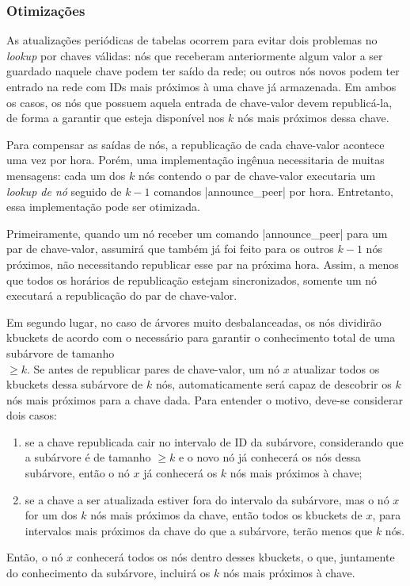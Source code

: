 
\subsubsection*{Otimizações}

As atualizações periódicas de tabelas ocorrem para evitar dois problemas no
\emph{lookup} por chaves válidas: nós que receberam anteriormente algum valor a ser
guardado naquele chave podem ter saído da rede; ou outros nós novos podem ter entrado
na rede com IDs mais próximos à uma chave já armazenada. Em ambos os casos, os nós que
possuem aquela entrada de chave-valor devem republicá-la, de forma a garantir que
esteja disponível nos $k$ nós mais próximos dessa chave.

Para compensar as saídas de nós, a republicação de cada chave-valor acontece uma vez por
hora. Porém, uma implementação ingênua necessitaria de muitas mensagens: cada um dos $k$
nós contendo o par de chave-valor executaria um \emph{lookup de nó} seguido de $k - 1$
comandos \bverb|announce_peer| por hora. Entretanto, essa implementação pode ser
otimizada.

Primeiramente, quando um nó receber um comando \bverb|announce_peer| para um par de
chave-valor, assumirá que também já foi feito para os outros $k - 1$ nós próximos, não
necessitando republicar esse par na próxima hora. Assim, a menos que todos os horários
de republicação estejam sincronizados, somente um nó executará a republicação do par de
chave-valor.

Em segundo lugar, no caso de árvores muito desbalanceadas, os nós dividirão
\glspl*{kbucket} de acordo com o necessário para garantir o conhecimento total de uma
subárvore de tamanho \\ $\geq k$. Se antes de republicar pares de chave-valor, um nó $x$
atualizar todos os \glspl*{kbucket} dessa subárvore de $k$ nós, automaticamente será
capaz de descobrir os $k$ nós mais próximos para a chave dada. Para entender o motivo,
deve-se considerar dois casos:

\begin{enumerate}
    \item se a chave republicada cair no intervalo de ID da subárvore, considerando que
        a subárvore é de tamanho $\geq k$ e o novo nó já conhecerá os nós dessa
        subárvore, então o nó $x$ já conhecerá os $k$ nós mais próximos à chave;

    \item se a chave a ser atualizada estiver fora do intervalo da subárvore, mas o nó
        $x$ for um dos $k$ nós mais próximos da chave, então todos os \glspl*{kbucket}
        de $x$, para intervalos mais próximos da chave do que a subárvore, terão menos
        que $k$ nós.
\end{enumerate}

Então, o nó $x$ conhecerá todos os nós dentro desses \glspl*{kbucket}, o que,
juntamente do conhecimento da subárvore, incluirá os $k$ nós mais próximos à chave.